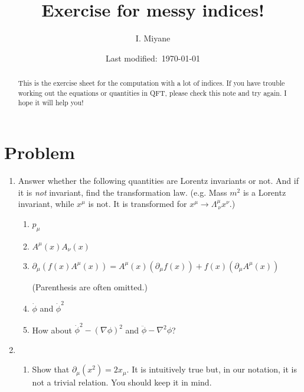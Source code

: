 \documentclass[a4paper,pdftex]{article}
\title{Exercise for messy indices!}
\author{I. Miyane}
\date{Last modified:\ \today}
\begin{document}
\maketitle

\begin{abstract}
   This is the exercise sheet for the computation with a lot of indices. If you have trouble working out the equations or quantities in QFT, please check this note and try again. I hope it will help you!
\end{abstract}

\tableofcontents

\clearpage
\section{Problem}

\begin{enumerate}

   \item 
   Answer whether the following quantities are Lorentz invariants or not. And if it is \textit{not} invariant, find the transformation law. (e.g. Mass $m^2$ is a Lorentz invariant, while $x^{\mu}$ is not. It is transformed for $x^{\mu}\rightarrow\Lambda^{\mu}_{\ \nu}x^{\nu}$.)

   \begin{enumerate}

      \item 
      $p_{\mu}$
      
      \item 
      $A^{\mu}(x)A_{\nu}(x)$

      \item 
      $\partial_{\mu}(f(x)A^{\mu}(x))=A^{\mu}(x)(\partial_{\mu}f(x))+f(x)(\partial_{\mu}A^{\mu}(x))$ 

      (Parenthesis are often omitted.)
      
      \item 
      $\dot{\phi}$ and $\dot{\phi}^2$

      \item 
      How about $\dot{\phi}^2-(\nabla\phi)^2$ and $\ddot{\phi}-\nabla^2\phi$?
   \end{enumerate}

   \item 
   \begin{enumerate}
      \item 
      Show that $\partial_{\mu}(x^2)=2x_{\mu}$. It is intuitively true but, in our notation, it is not a trivial relation. You should keep it in mind.


\end{enumerate}
\end{enumerate}
\end{document}
